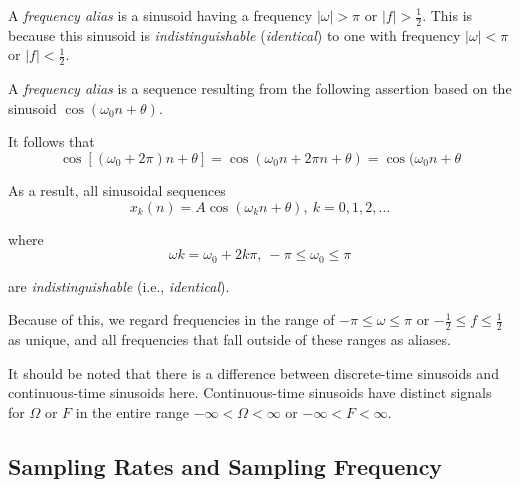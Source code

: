\begin{definition}\label{def:Frequency Alias}
  A \emph{frequency alias} is a sinusoid having a frequency $\lvert \omega \rvert > \pi$ or $\lvert f \rvert > \frac{1}{2}$.
  This is because this sinusoid is \emph{indistinguishable} (\emph{identical}) to one with  frequency $\lvert \omega \rvert < \pi$ or $\lvert f \rvert < \frac{1}{2}$.
  \newline
  \begin{blackbox}
    A \emph{frequency alias} is a sequence resulting from the
    following assertion based on the sinusoid
    $\cos(\omega_{0}n + \theta)$.

    It follows that
    \begin{equation*}
      \cos \left[ \left( \omega_{0} + 2\pi \right)n + \theta \right] = \cos \left( \omega_{0}n + 2\pi n + \theta \right) = \cos (\omega_{0}n + \theta
    \end{equation*}

    As a result, all sinusoidal sequences
    \begin{equation*}
      x_{k}(n) = A \cos (\omega_{k}n + \theta) , \> k=0, 1, 2, \ldots
    \end{equation*}

    where
    \begin{equation*}
      \omega k = \omega_{0} + 2k \pi , \> -\pi \leq \omega_{0} \leq \pi
    \end{equation*}

    are \emph{indistinguishable} (i.e., \emph{identical}). \newline
  \end{blackbox}

  Because of this, we regard frequencies in the range of $-\pi \leq \omega \leq \pi$ or $-\frac{1}{2} \leq f \leq \frac{1}{2}$ as unique, and all frequencies that fall outside of these ranges as aliases.

  \begin{remark}
    It should be noted that there is a difference between discrete-time sinusoids and continuous-time sinusoids here.
    Continuous-time sinusoids have distinct signals for $\Omega$ or $F$ in the entire range $-\infty < \Omega < \infty$ or $-\infty < F < \infty$.
  \end{remark}
\end{definition}

\subsection{Sampling Rates and Sampling Frequency}\label{subsec:Sampling Rates and Frequency}
